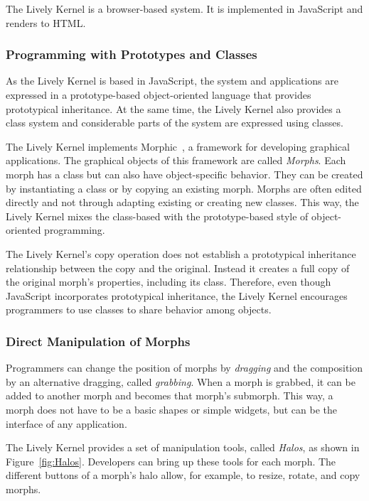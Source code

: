 The Lively Kernel is a browser-based system.
It is implemented in JavaScript and renders to HTML.

\subsubsection{Programming with Prototypes and Classes}

As the Lively Kernel is based in JavaScript, the system and applications are expressed in a prototype-based object-oriented language that provides prototypical inheritance.
At the same time, the Lively Kernel also provides a class system and considerable parts of the system are expressed using classes.

The Lively Kernel implements Morphic~\cite{Maloney1995Mor}, a framework for developing graphical applications.
The graphical objects of this framework are called \emph{Morphs}.
Each morph has a class but can also have object-specific behavior.
They can be created by instantiating a class or by copying an existing morph.
Morphs are often edited directly and not through adapting existing or creating new classes.
This way, the Lively Kernel mixes the class-based with the prototype-based style of object-oriented programming.

The Lively Kernel's copy operation does not establish a prototypical inheritance relationship between the copy and the original.
Instead it creates a full copy of the original morph's properties, including its class.
Therefore, even though JavaScript incorporates prototypical inheritance, the Lively Kernel encourages programmers to use classes to share behavior among objects.

\subsubsection{Direct Manipulation of Morphs}

Programmers can change the position of morphs by \emph{dragging} and the composition by an alternative dragging, called \emph{grabbing}.
When a morph is grabbed, it can be added to another morph and becomes that morph's submorph.
This way, a morph does not have to be a basic shapes or simple widgets, but can be the interface of any application.

The Lively Kernel provides a set of manipulation tools, called \emph{Halos}, as shown in Figure~\ref{fig:Halos}.
Developers can bring up these tools for each morph.
The different buttons of a morph's halo allow, for example, to resize, rotate, and copy morphs.

